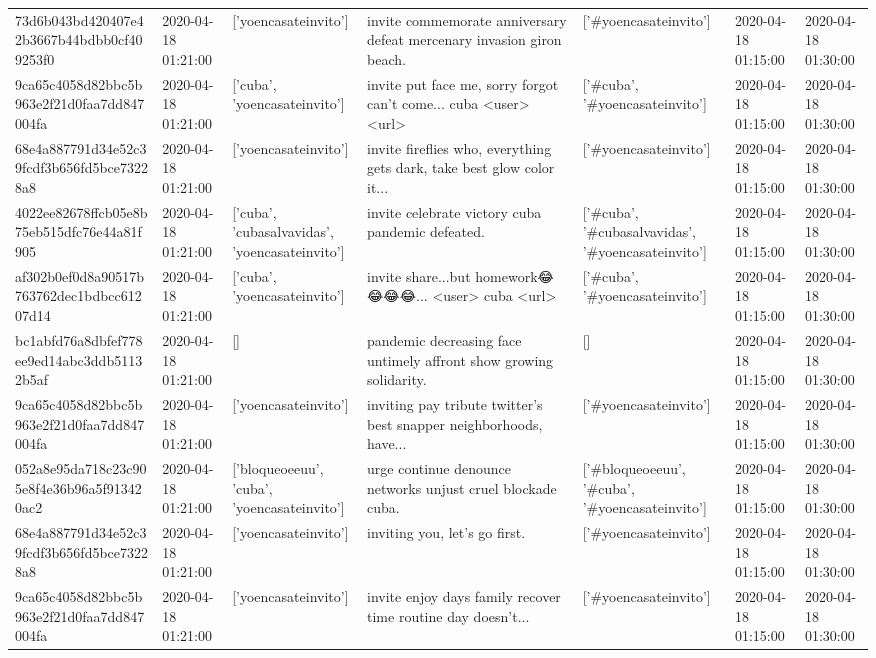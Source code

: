 \begin{tabular}{lllllll}
73d6b043bd420407e42b3667b44bdbb0cf409253f0 & 2020-04-18 01:21:00 & ['yoencasateinvito'] & invite commemorate anniversary defeat mercenary invasion giron beach. & ['#yoencasateinvito'] & 2020-04-18 01:15:00 & 2020-04-18 01:30:00 \\
9ca65c4058d82bbc5b963e2f21d0faa7dd847004fa & 2020-04-18 01:21:00 & ['cuba', 'yoencasateinvito'] & invite put face me, sorry forgot can't come... cuba <user> <url> & ['#cuba', '#yoencasateinvito'] & 2020-04-18 01:15:00 & 2020-04-18 01:30:00 \\
68e4a887791d34e52c39fcdf3b656fd5bce73228a8 & 2020-04-18 01:21:00 & ['yoencasateinvito'] & invite fireflies who, everything gets dark, take best glow color it... & ['#yoencasateinvito'] & 2020-04-18 01:15:00 & 2020-04-18 01:30:00 \\
4022ee82678ffcb05e8b75eb515dfc76e44a81f905 & 2020-04-18 01:21:00 & ['cuba', 'cubasalvavidas', 'yoencasateinvito'] & invite celebrate victory cuba pandemic defeated. & ['#cuba', '#cubasalvavidas', '#yoencasateinvito'] & 2020-04-18 01:15:00 & 2020-04-18 01:30:00 \\
af302b0ef0d8a90517b763762dec1bdbcc61207d14 & 2020-04-18 01:21:00 & ['cuba', 'yoencasateinvito'] & invite share...but homework😂😂😂😂... <user> cuba <url> & ['#cuba', '#yoencasateinvito'] & 2020-04-18 01:15:00 & 2020-04-18 01:30:00 \\
bc1abfd76a8dbfef778ee9ed14abc3ddb51132b5af & 2020-04-18 01:21:00 & [] & pandemic decreasing face untimely affront show growing solidarity. & [] & 2020-04-18 01:15:00 & 2020-04-18 01:30:00 \\
9ca65c4058d82bbc5b963e2f21d0faa7dd847004fa & 2020-04-18 01:21:00 & ['yoencasateinvito'] & inviting pay tribute twitter's best snapper neighborhoods, have... & ['#yoencasateinvito'] & 2020-04-18 01:15:00 & 2020-04-18 01:30:00 \\
052a8e95da718c23c905e8f4e36b96a5f913420ac2 & 2020-04-18 01:21:00 & ['bloqueoeeuu', 'cuba', 'yoencasateinvito'] & urge continue denounce networks unjust cruel blockade cuba. & ['#bloqueoeeuu', '#cuba', '#yoencasateinvito'] & 2020-04-18 01:15:00 & 2020-04-18 01:30:00 \\
68e4a887791d34e52c39fcdf3b656fd5bce73228a8 & 2020-04-18 01:21:00 & ['yoencasateinvito'] & inviting you, let's go first. & ['#yoencasateinvito'] & 2020-04-18 01:15:00 & 2020-04-18 01:30:00 \\
9ca65c4058d82bbc5b963e2f21d0faa7dd847004fa & 2020-04-18 01:21:00 & ['yoencasateinvito'] & invite enjoy days family recover time routine day doesn't... & ['#yoencasateinvito'] & 2020-04-18 01:15:00 & 2020-04-18 01:30:00 \\

\end{tabular}
